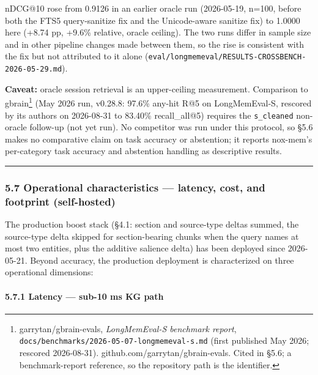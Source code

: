 \documentclass[
]{article}
\begin{document}
nDCG@10 rose from 0.9126 in an earlier oracle run (2026-05-19, n=100,
before both the FTS5 query-sanitize fix and the Unicode-aware sanitize
fix) to 1.0000 here (+8.74 pp, +9.6\% relative, oracle ceiling). The two
runs differ in sample size and in other pipeline changes made between
them, so the rise is consistent with the fix but not attributed to it
alone (\texttt{eval/longmemeval/RESULTS-CROSSBENCH-2026-05-29.md}).

\textbf{Caveat:} oracle session retrieval is an upper-ceiling
measurement. Comparison to gbrain\footnote{garrytan/gbrain-evals,
  \emph{LongMemEval-S benchmark report},
  \texttt{docs/benchmarks/2026-05-07-longmemeval-s.md} (first published
  May 2026; rescored 2026-08-31). github.com/garrytan/gbrain-evals.
  Cited in §5.6; a benchmark-report reference, so the repository path is
  the identifier.} (May 2026 run, v0.28.8: 97.6\% any-hit R@5 on
LongMemEval-S, rescored by its authors on 2026-08-31 to 83.40\%
recall\_all@5) requires the \texttt{s\_cleaned} non-oracle follow-up
(not yet run). No competitor was run under this protocol, so §5.6 makes
no comparative claim on task accuracy or abstention; it reports
nox-mem's per-category task accuracy and abstention handling as
descriptive results.

\begin{center}\rule{0.5\linewidth}{0.5pt}\end{center}

\subsubsection{5.7 Operational characteristics --- latency, cost, and
footprint
(self-hosted)}\label{operational-characteristics-latency-cost-and-footprint-self-hosted}

The production boost stack (§4.1: section and source-type deltas summed,
the source-type delta skipped for section-bearing chunks when the query
names at most two entities, plus the additive salience delta) has been
deployed since 2026-05-21. Beyond accuracy, the production deployment is
characterized on three operational dimensions:

\paragraph{5.7.1 Latency --- sub-10 ms KG
path}\label{latency-sub-10-ms-kg-path}
\end{document}
